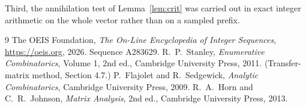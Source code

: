 \documentclass[11pt,a4paper]{article}
\theoremstyle{plain}
\theoremstyle{definition}
\begin{document}
Third, the annihilation test of Lemma~\ref{lem:crit} was carried out in exact integer
arithmetic on the whole vector rather than on a sampled prefix.

\begin{thebibliography}{9}
 The OEIS Foundation, \emph{The On-Line Encyclopedia of Integer
Sequences}, \url{https://oeis.org}, 2026. Sequence A283629.
 R.~P.~Stanley, \emph{Enumerative Combinatorics}, Volume 1, 2nd ed.,
Cambridge University Press, 2011. (Transfer-matrix method, Section 4.7.)
 P.~Flajolet and R.~Sedgewick, \emph{Analytic Combinatorics}, Cambridge
University Press, 2009.
 R.~A.~Horn and C.~R.~Johnson, \emph{Matrix Analysis}, 2nd ed., Cambridge
University Press, 2013.
\end{thebibliography}
\end{document}
